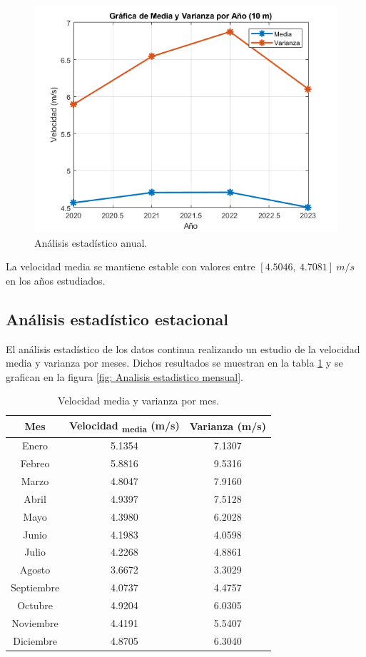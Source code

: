 \documentclass{IEEEtran}
\begin{document}
\begin{figure}[h]
    \centering
    \includegraphics[width = 0.5 \textwidth]{Imagenes/Grafica de Media y Varianza por Año.png}
    \caption{Análisis estadístico anual.}
    \label{fig: Analisis estadistico anual}
\end{figure}

La velocidad media se mantiene estable con valores entre $[4.5046,\ 4.7081]\ m/s$ en los años estudiados.

\subsection{Análisis estadístico estacional}

El análisis estadístico de los datos continua realizando un estudio de la velocidad media y varianza por meses. Dichos resultados se muestran en la tabla \ref{tab: Velocidad media y varianza por mes} y se grafican en la figura \ref{fig: Analisis estadistico mensual}.

\begin{table}[h]
    \centering
    \label{tab: Velocidad media y varianza por mes}
    \caption{Velocidad media y varianza por mes.}
    \begin{tabular}{|c|c|c|}
        \hline
        Mes & Velocidad \textsubscript{media} (m/s) & Varianza (m/s) \\
        \hline
        Enero & 5.1354 & 7.1307 \\
        Febreo & 5.8816 & 9.5316 \\
        Marzo & 4.8047 & 7.9160 \\
        Abril & 4.9397 & 7.5128 \\
        Mayo & 4.3980 & 6.2028 \\
        Junio & 4.1983 & 4.0598 \\
        Julio & 4.2268 & 4.8861 \\
        Agosto & 3.6672 & 3.3029 \\
        Septiembre & 4.0737 & 4.4757 \\
        Octubre & 4.9204 & 6.0305 \\
        Noviembre & 4.4191 & 5.5407 \\
        Diciembre & 4.8705 & 6.3040 \\
        \hline
    \end{tabular}
\end{table}
\end{document}
